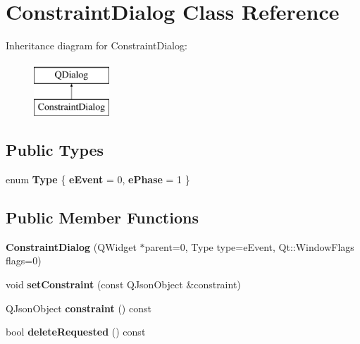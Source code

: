 \hypertarget{class_constraint_dialog}{\section{Constraint\-Dialog Class Reference}
\label{class_constraint_dialog}
}
Inheritance diagram for Constraint\-Dialog\-:\begin{figure}[H]
\begin{center}
\leavevmode
\includegraphics[height=2.000000cm]{class_constraint_dialog}
\end{center}
\end{figure}
\subsection*{Public Types}
\begin{DoxyCompactItemize}
\item 
enum {\bfseries Type} \{ {\bfseries e\-Event} = 0, 
{\bfseries e\-Phase} = 1
 \}
\end{DoxyCompactItemize}
\subsection*{Public Member Functions}
\begin{DoxyCompactItemize}
\item 
\hypertarget{class_constraint_dialog_a8d9a52d0f20e091223633d7d460aaf80}{{\bfseries Constraint\-Dialog} (Q\-Widget $\ast$parent=0, Type type=e\-Event, Qt\-::\-Window\-Flags flags=0)}\label{class_constraint_dialog_a8d9a52d0f20e091223633d7d460aaf80}

\item 
\hypertarget{class_constraint_dialog_aa93150370a50b855134a1db917339e41}{void {\bfseries set\-Constraint} (const Q\-Json\-Object \&constraint)}\label{class_constraint_dialog_aa93150370a50b855134a1db917339e41}

\item 
\hypertarget{class_constraint_dialog_a13d047be9628c3a08c355d670a080e35}{Q\-Json\-Object {\bfseries constraint} () const }\label{class_constraint_dialog_a13d047be9628c3a08c355d670a080e35}

\item 
\hypertarget{class_constraint_dialog_a403cd5c1177e8e1909e10afbdae0a9a6}{bool {\bfseries delete\-Requested} () const }\label{class_constraint_dialog_a403cd5c1177e8e1909e10afbdae0a9a6}

\end{DoxyCompactItemize}
